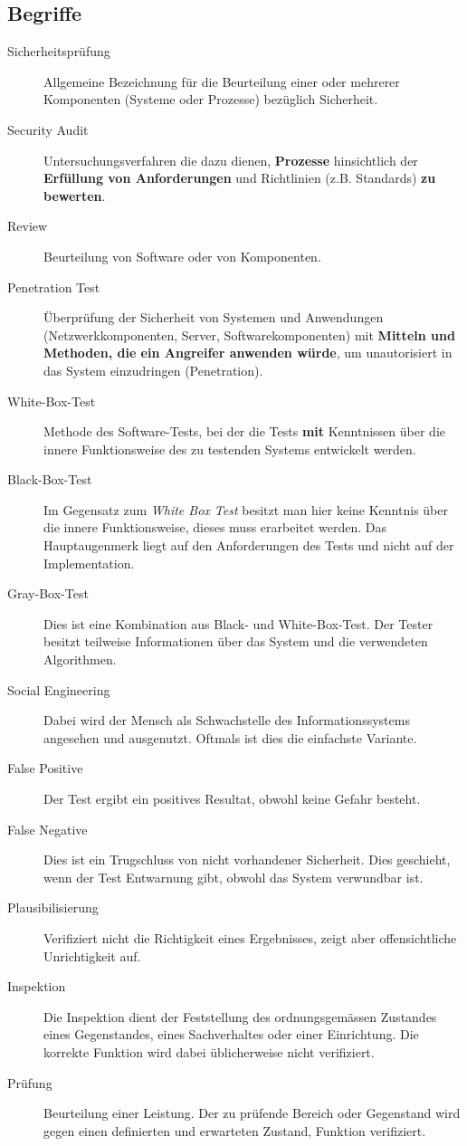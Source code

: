 \subsection{Begriffe}

\begin{description}
	\item[Sicherheitsprüfung] Allgemeine Bezeichnung für die Beurteilung einer oder mehrerer Komponenten (Systeme oder Prozesse) bezüglich Sicherheit.
	\item[Security Audit] Untersuchungsverfahren die dazu dienen, \textbf{Prozesse} hinsichtlich der \textbf{Erfüllung von Anforderungen} und Richtlinien (z.B. Standards) \textbf{zu bewerten}.
	\item[Review] Beurteilung von Software oder von Komponenten.
	\item[Penetration Test] Überprüfung der Sicherheit von Systemen und Anwendungen (Netzwerkkomponenten, Server, Softwarekomponenten) mit \textbf{Mitteln und Methoden, die ein Angreifer anwenden würde}, um unautorisiert in das System einzudringen (Penetration).
	\item[White-Box-Test] Methode des Software-Tests, bei der die Tests \textbf{mit} Kenntnissen über die innere Funktionsweise des zu testenden Systems entwickelt werden.
	\item[Black-Box-Test] Im Gegensatz zum \textit{White Box Test} besitzt man hier keine Kenntnis über die innere Funktionsweise, dieses muss erarbeitet werden. Das Hauptaugenmerk liegt auf den Anforderungen des Tests und nicht auf der Implementation.
	\item[Gray-Box-Test] Dies ist eine Kombination aus Black- und White-Box-Test. Der Tester besitzt teilweise Informationen über das System und die verwendeten Algorithmen.
	\item[Social Engineering] Dabei wird der Mensch als Schwachstelle des Informationssystems angesehen und ausgenutzt. Oftmals ist dies die einfachste Variante.
	\item[False Positive] Der Test ergibt ein positives Resultat, obwohl keine Gefahr besteht.
	\item[False Negative] Dies ist ein Trugschluss von nicht vorhandener Sicherheit. Dies geschieht, wenn der Test Entwarnung gibt, obwohl das System verwundbar ist.
	\item[Plausibilisierung] Verifiziert nicht die Richtigkeit eines Ergebnisses, zeigt aber offensichtliche Unrichtigkeit auf.
	\item[Inspektion] Die Inspektion dient der Feststellung des ordnungsgemässen Zustandes eines Gegenstandes, eines Sachverhaltes oder einer Einrichtung. Die korrekte Funktion wird dabei üblicherweise nicht verifiziert.
	\item[Prüfung] Beurteilung einer Leistung. Der zu prüfende Bereich oder Gegenstand wird gegen einen definierten und erwarteten Zustand, Funktion verifiziert.
\end{description}

